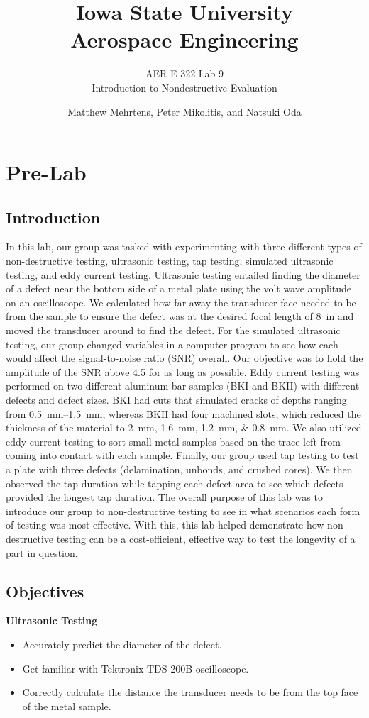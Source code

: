 \documentclass[12 pt]{report}
\title{\textbf{Iowa State University
\\{\Large Aerospace Engineering}}}
\subtitle{AER E 322 Lab 9\\
		  Introduction to Nondestructive Evaluation}
\author{Matthew Mehrtens, Peter Mikolitis, and Natsuki Oda}
\begin{document}
\maketitle
\tableofcontents

\chapter{Pre-Lab} \label{pre-lab}
\section{Introduction} \label{introduction}
In this lab, our group was tasked with experimenting with three different types of non-destructive testing, ultrasonic testing, tap testing, simulated ultrasonic testing, and eddy current testing. Ultrasonic testing entailed finding the diameter of a defect near the bottom side of a metal plate using the volt wave amplitude on an oscilloscope. We calculated how far away the transducer face needed to be from the sample to ensure the defect was at the desired focal length of \qty{8}{in} and moved the transducer around to find the defect. For the simulated ultrasonic testing, our group changed variables in a computer program to see how each would affect the signal-to-noise ratio (SNR) overall. Our objective was to hold the amplitude of the SNR above \num{4.5} for as long as possible. Eddy current testing was performed on two different aluminum bar samples (BKI and BKII) with different defects and defect sizes. BKI had cuts that simulated cracks of depths ranging from \qtyrange{0.5}{1.5}{\mm}, whereas BKII had four machined slots, which reduced the thickness of the material to \qtylist{2;1.6;1.2;0.8}{\mm}. We also utilized eddy current testing to sort small metal samples based on the trace left from coming into contact with each sample. Finally, our group used tap testing to test a plate with three defects (delamination, unbonds, and crushed cores). We then observed the tap duration while tapping each defect area to see which defects provided the longest tap duration. The overall purpose of this lab was to introduce our group to non-destructive testing to see in what scenarios each form of testing was most effective. With this, this lab helped demonstrate how non-destructive testing can be a cost-efficient, effective way to test the longevity of a part in question.

\section{Objectives} \label{objectives}
\textbf{Ultrasonic Testing} 
\begin{itemize}
	\item Accurately predict the diameter of the defect.
	\item Get familiar with Tektronix TDS 200B oscilloscope.
	\item Correctly calculate the distance the transducer needs to be from the top face of the metal sample.
\end{itemize}
\end{document}
